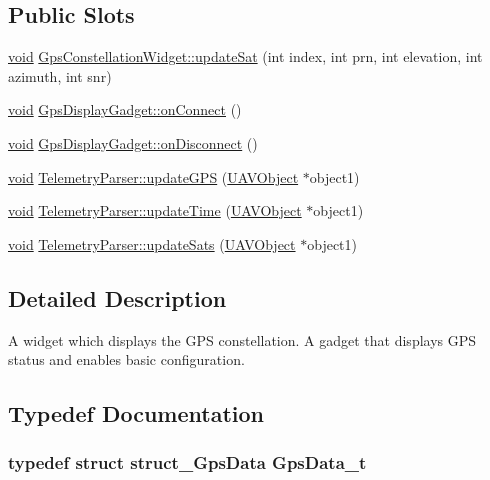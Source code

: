 \subsection*{\-Public \-Slots}
\begin{DoxyCompactItemize}
\item 
\hyperlink{group___u_a_v_objects_plugin_ga444cf2ff3f0ecbe028adce838d373f5c}{void} \hyperlink{group___g_p_s_gadget_plugin_gaa995e2d09a888698ad0aae9ba0a91ebf}{\-Gps\-Constellation\-Widget\-::update\-Sat} (int index, int prn, int elevation, int azimuth, int snr)
\item 
\hyperlink{group___u_a_v_objects_plugin_ga444cf2ff3f0ecbe028adce838d373f5c}{void} \hyperlink{group___g_p_s_gadget_plugin_ga23030a328c534cd4b1eea152db173655}{\-Gps\-Display\-Gadget\-::on\-Connect} ()
\item 
\hyperlink{group___u_a_v_objects_plugin_ga444cf2ff3f0ecbe028adce838d373f5c}{void} \hyperlink{group___g_p_s_gadget_plugin_ga3f91bba10918be6c7bd99533e61883ac}{\-Gps\-Display\-Gadget\-::on\-Disconnect} ()
\item 
\hyperlink{group___u_a_v_objects_plugin_ga444cf2ff3f0ecbe028adce838d373f5c}{void} \hyperlink{group___g_p_s_gadget_plugin_ga9b1c1509701c154ad1c3cdeef0cb522b}{\-Telemetry\-Parser\-::update\-G\-P\-S} (\hyperlink{class_u_a_v_object}{\-U\-A\-V\-Object} $\ast$object1)
\item 
\hyperlink{group___u_a_v_objects_plugin_ga444cf2ff3f0ecbe028adce838d373f5c}{void} \hyperlink{group___g_p_s_gadget_plugin_gadc9bd95e3443207fbededb6a3fd014a7}{\-Telemetry\-Parser\-::update\-Time} (\hyperlink{class_u_a_v_object}{\-U\-A\-V\-Object} $\ast$object1)
\item 
\hyperlink{group___u_a_v_objects_plugin_ga444cf2ff3f0ecbe028adce838d373f5c}{void} \hyperlink{group___g_p_s_gadget_plugin_ga3bdc5591ff2751d19016d60668b18440}{\-Telemetry\-Parser\-::update\-Sats} (\hyperlink{class_u_a_v_object}{\-U\-A\-V\-Object} $\ast$object1)
\end{DoxyCompactItemize}


\subsection{\-Detailed \-Description}
\-A widget which displays the \-G\-P\-S constellation. \-A gadget that displays \-G\-P\-S status and enables basic configuration. 

\subsection{\-Typedef \-Documentation}
\hypertarget{group___g_p_s_gadget_plugin_ga4f1b5520a42a0033fb4d09fc7cbc2197}{
\subsubsection[{\-Gps\-Data\-\_\-t}]{\setlength{\rightskip}{0pt plus 5cm}typedef struct {\bf struct\-\_\-\-Gps\-Data} {\bf \-Gps\-Data\-\_\-t}}}\label{group___g_p_s_gadget_plugin_ga4f1b5520a42a0033fb4d09fc7cbc2197}


